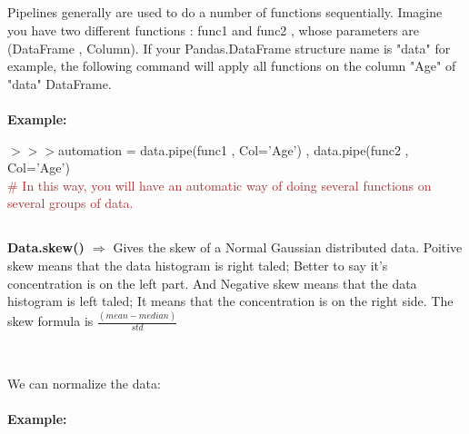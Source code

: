 \documentclass[a4paper,18pt]{article}
\begin{document}

\subsection{\colorbox {matgreen}{\color{white}{\large Pipeline in pandas}}}
Pipelines generally are used to do a number of functions sequentially. Imagine you have two different functions : func1 and func2 , whose parameters are (DataFrame , Column). If your Pandas.DataFrame structure name is "data" for example, the following command will apply all functions on the column "Age" of "data" DataFrame. \\\\
\textbf{Example:\\}

$>>>$automation = data.pipe(func1 , Col='Age') , data.pipe(func2 , Col='Age')\\

{\textcolor{brown}{\# In this way, you will have an automatic way of doing several functions on several groups of data.}}\\



\subsection{\colorbox {matgreen}{\color{white}{\large Data.skew()}}}
\textbf{Data.skew() $\Rightarrow$} Gives the skew of a Normal Gaussian distributed data. Poitive skew means that the data histogram is right taled; Better to say it's concentration is on the left part. And Negative skew means that the data histogram is left taled; It means that the concentration is on the right side. The skew formula is $\frac{(mean-median)}{std}$\\\\


\subsection{\colorbox {matgreen}{\color{white}{\large Normalizing}}}
We can normalize the data:\\\\
\textbf{Example:\\}
\end{document}
